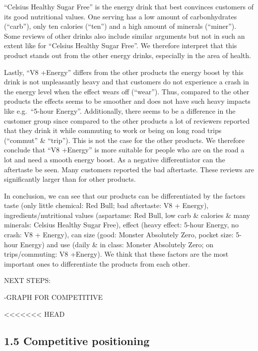 \documentclass[
]{article}
\begin{document}
``Celsius Healthy Sugar Free'' is the energy drink that best convinces
customers of its good nutritional values. One serving has a low amount
of carbonhydrates (``carb''), only ten calories (``ten'') and a high
amount of minerals (``miner''). Some reviews of other drinks also
include similar arguments but not in such an extent like for ``Celsius
Healthy Sugar Free''. We therefore interpret that this product stands
out from the other energy drinks, especially in the area of health.

Lastly, ``V8 +Energy'' differs from the other products the energy boost
by this drink is not unpleasantly heavy and that customers do not
experience a crash in the energy level when the effect wears off
(``wear''). Thus, compared to the other products the effects seems to be
smoother and does not have such heavy impacts like e.g.~``5-hour
Energy''. Additionally, there seems to be a difference in the customer
group since compared to the other products a lot of reviewers reported
that they drink it while commuting to work or being on long road trips
(``commut'' \& ``trip''). This is not the case for the other products.
We therefore conclude that ``V8 +Energy'' is more suitable for people
who are on the road a lot and need a smooth energy boost. As a negative
differentiator can the aftertaste be seen. Many customers reported the
bad aftertaste. These reviews are significantly larger than for other
products.

In conclusion, we can see that our products can be differentiated by the
factors taste (only little chemical: Red Bull; bad aftertaste: V8 +
Energy), ingredients/nutritional values (aspartame: Red Bull, low carb
\& calories \& many minerals: Celsius Healthy Sugar Free), effect (heavy
effect: 5-hour Energy, no crash: V8 + Energy), can size (good: Monster
Absolutely Zero, pocket size: 5-hour Energy) and use (daily \& in class:
Monster Absolutely Zero; on trips/commuting: V8 +Energy). We think that
these factors are the most important ones to differentiate the products
from each other.

NEXT STEPS:

-GRAPH FOR COMPETITIVE

\textless\textless\textless\textless\textless\textless\textless{} HEAD

\hypertarget{competitive-positioning}{%
\subsection{1.5 Competitive positioning}\label{competitive-positioning}}
\end{document}
